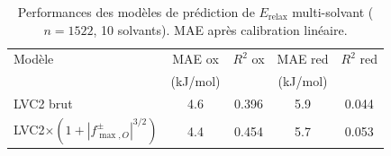 \begin{table}[htbp]
\centering
\caption{Performances des modèles de prédiction de $E_{\text{relax}}$ multi-solvant ($n=1522$, 10 solvants). MAE après calibration linéaire.}
\label{tab:s42_performance}
\begin{tabular}{lcccc}
\toprule
Modèle & MAE ox & $R^2$ ox & MAE red & $R^2$ red \\
       & (kJ/mol) &        & (kJ/mol) &        \\
\midrule
LVC2 brut & 4.6 & 0.396 & 5.9 & 0.044 \\
LVC2$\times(1+|f^\pm_{\max,O}|^{3/2})$ & 4.4 & 0.454 & 5.7 & 0.053 \\
\bottomrule
\end{tabular}
\end{table}
